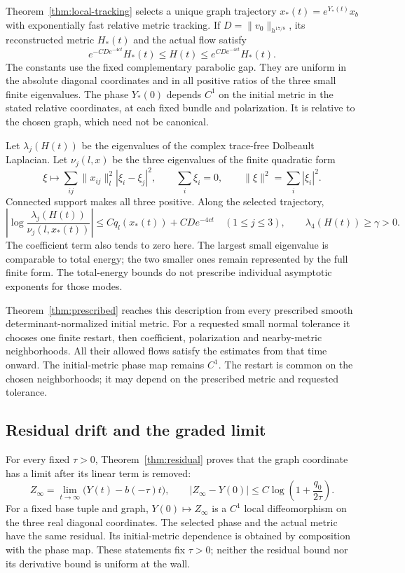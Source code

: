 \documentclass[11pt]{amsart}
\theoremstyle{definition}
\theoremstyle{remark}
\begin{document}
Theorem~\ref{thm:local-tracking} selects a unique graph
trajectory $x_*(t)=e^{Y_*(t)}x_b$ with exponentially fast
relative metric tracking. If
$D=\|v_0\|_{h^{17/8}}$, its reconstructed metric $H_*(t)$
and the actual flow satisfy
\begin{equation}\label{eq:intro-tracking}
 e^{-CD e^{-4ct}}H_*(t)\le H(t)
                   \le e^{CD e^{-4ct}}H_*(t).
\end{equation}
The constants use the fixed complementary parabolic gap.
They are uniform in the absolute diagonal coordinates and
in all positive ratios of the three small finite eigenvalues.
The phase $Y_*(0)$ depends $C^1$ on the initial metric in
the stated relative coordinates, at each fixed bundle and
polarization. It is relative to the chosen graph, which
need not be canonical.

Let $\lambda_j(H(t))$ be the eigenvalues of the complex
trace-free Dolbeault Laplacian. Let $\nu_j(l,x)$ be the
three eigenvalues of the finite quadratic form
\[
 \xi\longmapsto\sum_{ij}\|x_{ij}\|_l^2|\xi_i-\xi_j|^2,
 \qquad \sum_i\xi_i=0,\qquad \|\xi\|^2=\sum_i|\xi_i|^2 .
\]
Connected support makes all three positive. Along the
selected trajectory,
\begin{equation}\label{eq:intro-spectra}
 \left|\log\frac{\lambda_j(H(t))}{\nu_j(l,x_*(t))}\right|
 \le Cq_l(x_*(t))+CD e^{-4ct}\quad(1\le j\le3),
 \qquad \lambda_4(H(t))\ge\gamma>0 .
\end{equation}
The coefficient term also tends to zero here. The largest
small eigenvalue is comparable to total energy; the two
smaller ones remain represented by the full finite form.
The total-energy bounds do not prescribe individual
asymptotic exponents for those modes.

Theorem~\ref{thm:prescribed} reaches this description from
every prescribed smooth determinant-normalized initial metric.
For a requested small normal tolerance it chooses one finite
restart, then coefficient, polarization and nearby-metric
neighborhoods. All their allowed flows satisfy the estimates
from that time onward. The initial-metric phase map remains
$C^1$. The restart is common on the chosen neighborhoods;
it may depend on the prescribed metric and requested tolerance.

\subsection{Residual drift and the graded limit}
For every fixed $\tau>0$, Theorem~\ref{thm:residual} proves
that the graph coordinate has a limit after its linear term
is removed:
\[
 Z_\infty=\lim_{t\to\infty}\bigl(Y(t)-b(-\tau)t\bigr),\qquad
 |Z_\infty-Y(0)|
       \le C\log\left(1+\frac{q_0}{2\tau}\right).
\]
For a fixed base tuple and graph, $Y(0)\mapsto Z_\infty$
is a $C^1$ local diffeomorphism on the three real diagonal
coordinates. The selected phase and the actual metric have
the same residual. Its initial-metric dependence is obtained
by composition with the phase map. These statements fix
$\tau>0$; neither the residual bound nor its derivative
bound is uniform at the wall.
\end{document}
